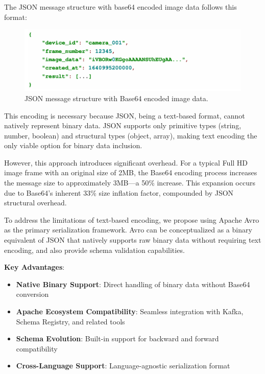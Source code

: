 The JSON message structure with base64 encoded image data follows this format:

\begin{figure}[htbp]
    \centering
    \includegraphics[width=1\textwidth]{Figure/json_base64.png}
    \caption{JSON message structure with Base64 encoded image data.}
    \label{fig:json_base64}
\end{figure}

This encoding is necessary because JSON, being a text-based format, cannot natively represent binary data. JSON supports only primitive types (string, number, boolean) and structural types (object, array), making text encoding the only viable option for binary data inclusion.

However, this approach introduces significant overhead. For a typical Full HD image frame with an original size of 2MB, the Base64 encoding process increases the message size to approximately 3MB—a 50\% increase. This expansion occurs due to Base64's inherent 33\% size inflation factor, compounded by JSON structural overhead.


To address the limitations of text-based encoding, we propose using Apache Avro as the primary serialization framework. Avro can be conceptualized as a binary equivalent of JSON that natively supports raw binary data without requiring text encoding, and also provide schema validation capabilities.

\textbf{Key Advantages}:
\begin{itemize}
    \item \textbf{Native Binary Support}: Direct handling of binary data without Base64 conversion
    \item \textbf{Apache Ecosystem Compatibility}: Seamless integration with Kafka, Schema Registry, and related tools
    \item \textbf{Schema Evolution}: Built-in support for backward and forward compatibility
    \item \textbf{Cross-Language Support}: Language-agnostic serialization format
\end{itemize}

